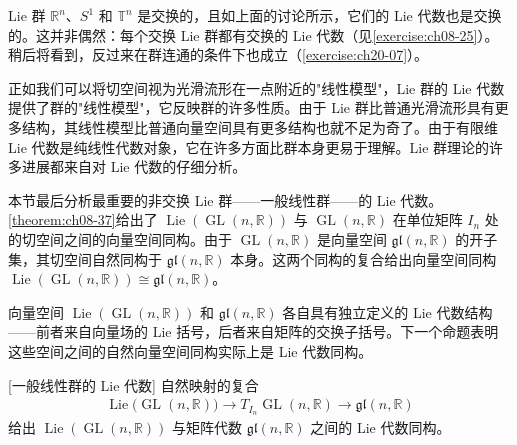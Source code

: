 \documentclass[../../main.tex]{subfiles}
\begin{document}
Lie 群 $\mathbb{R}^n$、$S^1$ 和 $\mathbb{T}^n$ 是交换的，且如上面的讨论所示，它们的 Lie 代数也是交换的。这并非偶然：每个交换 Lie 群都有交换的 Lie 代数（见\cref{exercise:ch08-25}）。稍后将看到，反过来在群连通的条件下也成立（\cref{exercise:ch20-07}）。

正如我们可以将切空间视为光滑流形在一点附近的"线性模型"，Lie 群的 Lie 代数提供了群的"线性模型"，它反映群的许多性质。由于 Lie 群比普通光滑流形具有更多结构，其线性模型比普通向量空间具有更多结构也就不足为奇了。由于有限维 Lie 代数是纯线性代数对象，它在许多方面比群本身更易于理解。Lie 群理论的许多进展都来自对 Lie 代数的仔细分析。

本节最后分析最重要的非交换 Lie 群——一般线性群——的 Lie 代数。\cref{theorem:ch08-37}给出了 $\operatorname{Lie}(\operatorname{GL}(n,\mathbb{R}))$ 与 $\operatorname{GL}(n,\mathbb{R})$ 在单位矩阵 $I_n$ 处的切空间之间的向量空间同构。由于 $\operatorname{GL}(n,\mathbb{R})$ 是向量空间 $\mathfrak{gl}(n,\mathbb{R})$ 的开子集，其切空间自然同构于 $\mathfrak{gl}(n,\mathbb{R})$ 本身。这两个同构的复合给出向量空间同构 $\operatorname{Lie}(\operatorname{GL}(n,\mathbb{R}))\cong\mathfrak{gl}(n,\mathbb{R})$。

向量空间 $\operatorname{Lie}(\operatorname{GL}(n,\mathbb{R}))$ 和 $\mathfrak{gl}(n,\mathbb{R})$ 各自具有独立定义的 Lie 代数结构——前者来自向量场的 Lie 括号，后者来自矩阵的交换子括号。下一个命题表明这些空间之间的自然向量空间同构实际上是 Lie 代数同构。

\begin{proposition}\label{proposition:ch08-41}[一般线性群的 Lie 代数]
自然映射的复合
\begin{align}
\operatorname{Lie}\bigl(\operatorname{GL}(n,\mathbb{R})\bigr)\to T_{I_n}\operatorname{GL}(n,\mathbb{R})\to\mathfrak{gl}(n,\mathbb{R})\label{align:ch08-14}
\end{align}
给出 $\operatorname{Lie}(\operatorname{GL}(n,\mathbb{R}))$ 与矩阵代数 $\mathfrak{gl}(n,\mathbb{R})$ 之间的 Lie 代数同构。
\end{proposition}
\end{document}

